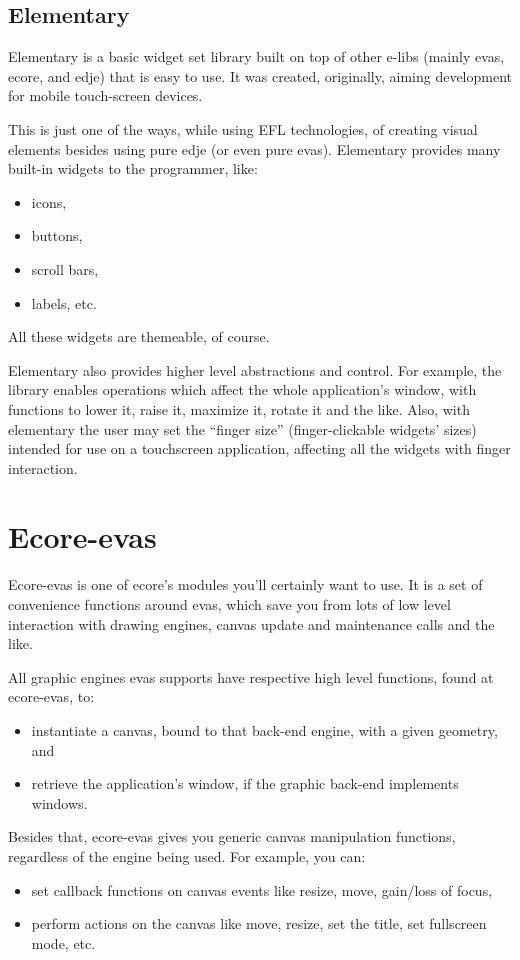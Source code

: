 \documentclass[a4paper]{profusion}
\begin{document}
\subsection{Elementary}

Elementary is a basic widget set library built on top of other e-libs
(mainly evas, ecore, and edje) that is easy to use. It was created,
originally, aiming development for mobile touch-screen devices.

This is just one of the ways, while using EFL technologies, of
creating visual elements besides using pure edje (or even pure
evas). Elementary provides many built-in widgets to the programmer,
like:

\begin{itemize}
\item icons,
\item buttons,
\item scroll bars,
\item labels, etc.
\end{itemize}
All these widgets are themeable, of course.

Elementary also provides higher level abstractions and control. For
example, the library enables operations which affect the whole
application's window, with functions to lower it, raise it, maximize
it, rotate it and the like. Also, with elementary the user may set the
``finger size'' (finger-clickable widgets' sizes) intended for use on
a touchscreen application, affecting all the widgets with finger
interaction.

\section{Ecore-evas}
Ecore-evas is one of ecore's modules you'll certainly want to use.  It
is a set of convenience functions around evas, which save you from
lots of low level interaction with drawing engines, canvas update and
maintenance calls and the like.

All graphic engines evas supports have respective high level
functions, found at ecore-evas, to:

\begin{itemize}
\item instantiate a canvas, bound to that back-end engine, with a
  given geometry, and
\item retrieve the application's window, if the graphic back-end
  implements windows.
\end{itemize}

Besides that, ecore-evas gives you generic canvas manipulation
functions, regardless of the engine being used. For example, you can:
\begin{itemize}
\item set callback functions on canvas events like resize, move,
  gain/loss of focus,
\item perform actions on the canvas like move, resize, set the title,
  set fullscreen mode, etc.
\end{itemize}
\end{document}

